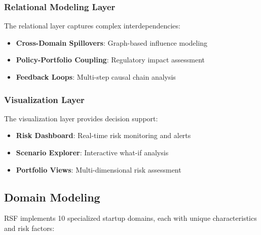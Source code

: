 \subsubsection{Relational Modeling Layer}
The relational layer captures complex interdependencies:
\begin{itemize}
    \item \textbf{Cross-Domain Spillovers}: Graph-based influence modeling
    \item \textbf{Policy-Portfolio Coupling}: Regulatory impact assessment
    \item \textbf{Feedback Loops}: Multi-step causal chain analysis
\end{itemize}

\subsubsection{Visualization Layer}
The visualization layer provides decision support:
\begin{itemize}
    \item \textbf{Risk Dashboard}: Real-time risk monitoring and alerts
    \item \textbf{Scenario Explorer}: Interactive what-if analysis
    \item \textbf{Portfolio Views}: Multi-dimensional risk assessment
\end{itemize}

\subsection{Domain Modeling}

RSF implements 10 specialized startup domains, each with unique characteristics and risk factors:

